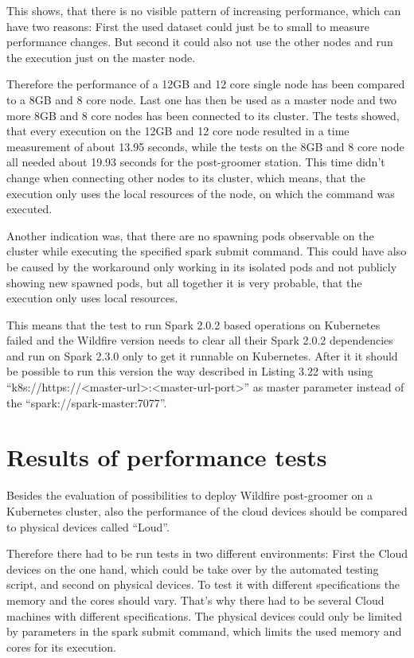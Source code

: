 This shows, that there is no visible pattern of increasing performance, which can have two reasons: First the used dataset could just be to small to measure performance changes. But second it could also not use the other nodes and run the execution just on the master node.

Therefore the performance of a 12GB and 12 core single node has been compared to a 8GB and 8 core node. Last one has then be used as a master node and two more 8GB and 8 core nodes has been connected to its cluster. The tests showed, that every execution on the 12GB and 12 core node resulted in a time measurement of about 13.95 seconds, while the tests on the 8GB and 8 core node all needed about 19.93 seconds for the post-groomer station. This time didn't change when connecting other nodes to its cluster, which means, that the execution only uses the local resources of the node, on which the command was executed.

Another indication was, that there are no spawning pods observable on the cluster while executing the specified spark submit command. This could have also be caused by the workaround only working in its isolated pods and not publicly showing new spawned pods, but all together it is very probable, that the execution only uses local resources.

This means that the test to run Spark 2.0.2 based operations on Kubernetes failed and the Wildfire version needs to clear all their Spark 2.0.2 dependencies and run on Spark 2.3.0 only to get it runnable on Kubernetes. After it it should be possible to run this version the way described in Listing 3.22 with using ``k8s://https://<master-url>:<master-url-port>'' as master parameter instead of the ``spark://spark-master:7077''.

\section{Results of performance tests}

Besides the evaluation of possibilities to deploy Wildfire post-groomer on a Kubernetes cluster, also the performance of the cloud devices should be compared to physical devices called ``Loud''.

Therefore there had to be run tests in two different environments: First the Cloud devices on the one hand, which could be take over by the automated testing script, and second on physical devices. To test it with different specifications the memory and the cores should vary. That's why there had to be several Cloud machines with different specifications. The physical devices could only be limited by parameters in the spark submit command, which limits the used memory and cores for its execution.

